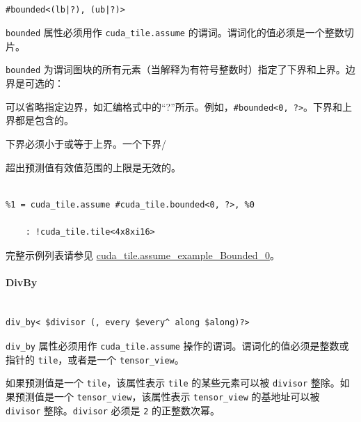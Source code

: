 \documentclass{article}
\begin{document}
\begin{lstlisting}

#bounded<(lb|?), (ub|?)>

\end{lstlisting}



\texttt{bounded} 属性必须用作 \texttt{cuda\_tile.assume} 的谓词。谓词化的值必须是一个整数切片。



\texttt{bounded} 为谓词图块的所有元素（当解释为有符号整数时）指定了下界和上界。边界是可选的：

可以省略指定边界，如汇编格式中的``?''所示。例如，\texttt{\#bounded<0, ?>}。下界和上界都是包含的。



下界必须小于或等于上界。一个下界/

超出预测值有效值范围的上限是无效的。



\begin{lstlisting}

%1 = cuda_tile.assume #cuda_tile.bounded<0, ?>, %0

    : !cuda_tile.tile<4x8xi16>

\end{lstlisting}



完整示例列表请参见 \href{https://docs.nvidia.com/cuda/tile-ir/latest/sections/appendix.html#example-cuda-tile-assume-example-bounded-0}{cuda\_tile.assume\_example\_Bounded\_0}。





\paragraph{DivBy}


\begin{lstlisting}

div_by< $divisor (, every $every^ along $along)?>

\end{lstlisting}



\texttt{div\_by} 属性必须用作 \texttt{cuda\_tile.assume} 操作的谓词。谓词化的值必须是整数或指针的 \texttt{tile}，或者是一个 \texttt{tensor\_view}。



如果预测值是一个 \texttt{tile}，该属性表示 \texttt{tile} 的某些元素可以被 \texttt{divisor} 整除。如果预测值是一个 \texttt{tensor\_view}，该属性表示 \texttt{tensor\_view} 的基地址可以被 \texttt{divisor} 整除。\texttt{divisor} 必须是 \texttt{2} 的正整数次幂。
\end{document}
